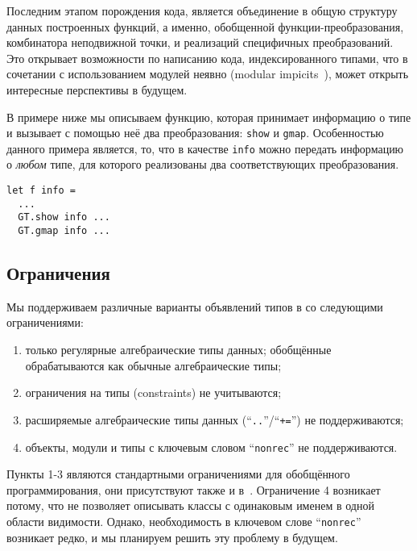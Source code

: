 Последним этапом порождения кода, является объединение в общую структуру данных построенных функций, а именно, обобщенной функции-преобразования, комбинатора неподвижной точки, и реализаций специфичных преобразований. Это открывает возможности по написанию кода, индексированного типами, что в сочетании с использованием модулей неявно (modular impicits~\cite{ModularImplicits}), может открыть интересные перспективы в будущем. 

В примере ниже мы описываем функцию, которая принимает информацию о типе и вызывает с помощью неё два преобразования: \lstinline{show} и \lstinline{gmap}.
Особенностью данного примера является, то, что в качестве \lstinline{info} можно передать информацию о \emph{любом} типе, для которого реализованы два соответствующих преобразования.


\begin{lstlisting}
let f info = 
  ... 
  GT.show info ...
  GT.gmap info ...
\end{lstlisting}


\subsection{Ограничения}

Мы поддерживаем различные варианты объявлений типов в  \ocaml{} со следующими ограничениями:

\begin{enumerate}[1)]
\item только регулярные алгебраические типы данных; обобщённые~\cite{GADT} обрабатываются как обычные алгебраические типы;
\item ограничения на типы (constraints) не учитываются;
\item расширяемые алгебраические типы данных
(``\lstinline{..}''/``\lstinline{+=}'') не поддерживаются;
\item объекты, модули и типы с ключевым словом ``\lstinline{nonrec}'' не поддерживаются.
\end{enumerate}

\noindent Пункты 1-3 являются стандартными ограничениями для обобщённого программирования, они присутствуют также и в~\cite{ppxderiving}. Ограничение 4 возникает потому, что \ocaml{} не позволяет описывать классы с одинаковым именем в одной области видимости. Однако,  необходимость в ключевом слове ``\lstinline{nonrec}'' возникает редко, и мы планируем решить эту проблему в будущем.













